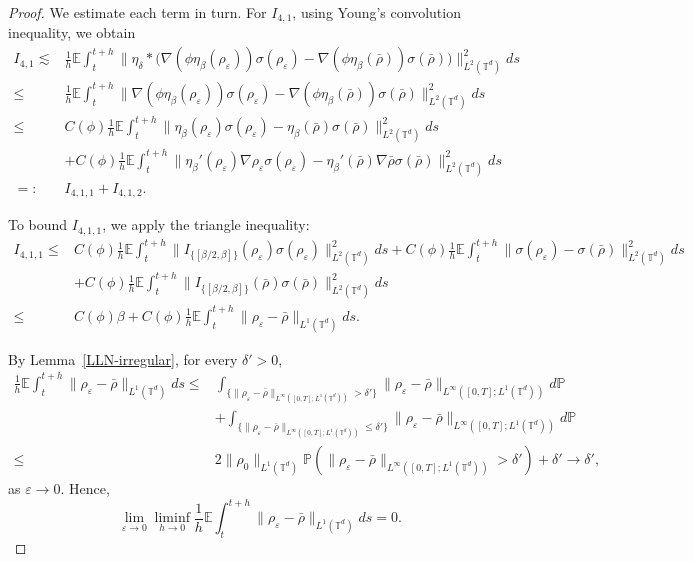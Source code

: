\documentclass[UTF-8,reqno]{amsart}
\numberwithin{equation}{section}
\def\leq{\leqslant}
\def\leq{\leqslant}
\begin{document}
\begin{proof}
We estimate each term in turn. For $I_{4,1}$, using Young's convolution inequality, we obtain
\begin{align*}
I_{4,1} \lesssim& \frac{1}{h} \mathbb{E} \int_t^{t+h} \|\eta_{\delta} \ast \big( \nabla(\phi \eta_{\beta}(\rho_{\varepsilon})) \sigma(\rho_{\varepsilon}) - \nabla(\phi \eta_{\beta}(\bar{\rho})) \sigma(\bar{\rho}) \big) \|_{L^2(\mathbb{T}^d)}^2 ds \\
\leq& \frac{1}{h} \mathbb{E} \int_t^{t+h} \| \nabla(\phi \eta_{\beta}(\rho_{\varepsilon})) \sigma(\rho_{\varepsilon}) - \nabla(\phi \eta_{\beta}(\bar{\rho})) \sigma(\bar{\rho}) \|_{L^2(\mathbb{T}^d)}^2 ds \\
\leq& C(\phi) \frac{1}{h} \mathbb{E} \int_t^{t+h} \| \eta_{\beta}(\rho_{\varepsilon}) \sigma(\rho_{\varepsilon}) - \eta_{\beta}(\bar{\rho}) \sigma(\bar{\rho}) \|_{L^2(\mathbb{T}^d)}^2 ds \\
&+ C(\phi) \frac{1}{h} \mathbb{E} \int_t^{t+h} \| \eta_{\beta}'(\rho_{\varepsilon}) \nabla\rho_{\varepsilon} \sigma(\rho_{\varepsilon}) - \eta_{\beta}'(\bar{\rho}) \nabla\bar{\rho} \sigma(\bar{\rho}) \|_{L^2(\mathbb{T}^d)}^2 ds \\
=:& I_{4,1,1} + I_{4,1,2}.
\end{align*}

To bound $I_{4,1,1}$, we apply the triangle inequality:
\begin{align*}
I_{4,1,1} \leq& C(\phi) \frac{1}{h} \mathbb{E} \int_t^{t+h} \| I_{\{[\beta/2,\beta]\}}(\rho_{\varepsilon}) \sigma(\rho_{\varepsilon}) \|_{L^2(\mathbb{T}^d)}^2 ds + C(\phi) \frac{1}{h} \mathbb{E} \int_t^{t+h} \| \sigma(\rho_{\varepsilon}) - \sigma(\bar{\rho}) \|_{L^2(\mathbb{T}^d)}^2 ds \\
&+ C(\phi) \frac{1}{h} \mathbb{E} \int_t^{t+h} \| I_{\{[\beta/2,\beta]\}}(\bar{\rho}) \sigma(\bar{\rho}) \|_{L^2(\mathbb{T}^d)}^2 ds \\
\leq& C(\phi)\beta + C(\phi) \frac{1}{h} \mathbb{E} \int_t^{t+h} \| \rho_{\varepsilon} - \bar{\rho} \|_{L^1(\mathbb{T}^d)} ds.
\end{align*}

By Lemma~\ref{LLN-irregular}, for every $\delta'>0$,
\begin{align*}
\frac{1}{h} \mathbb{E} \int_t^{t+h} \|\rho_{\varepsilon} - \bar{\rho}\|_{L^1(\mathbb{T}^d)} ds \leq& \int_{\{\|\rho_{\varepsilon} - \bar{\rho}\|_{L^{\infty}([0,T];L^1(\mathbb{T}^d))} > \delta'\}} \|\rho_{\varepsilon} - \bar{\rho}\|_{L^{\infty}([0,T];L^1(\mathbb{T}^d))} d\mathbb{P} \\
&+ \int_{\{\|\rho_{\varepsilon} - \bar{\rho}\|_{L^{\infty}([0,T];L^1(\mathbb{T}^d))} \leq \delta'\}} \|\rho_{\varepsilon} - \bar{\rho}\|_{L^{\infty}([0,T];L^1(\mathbb{T}^d))} d\mathbb{P} \\
\leq& 2\|\rho_0\|_{L^1(\mathbb{T}^d)} \mathbb{P}\left( \|\rho_{\varepsilon} - \bar{\rho}\|_{L^{\infty}([0,T];L^1(\mathbb{T}^d))} > \delta' \right) + \delta' \to \delta',
\end{align*}
as $\varepsilon \to 0$. Hence,
$$
\lim_{\varepsilon \to 0} \liminf_{h \to 0} \frac{1}{h} \mathbb{E} \int_t^{t+h} \|\rho_{\varepsilon} - \bar{\rho}\|_{L^1(\mathbb{T}^d)} ds = 0.
$$


\end{proof}
\end{document}
